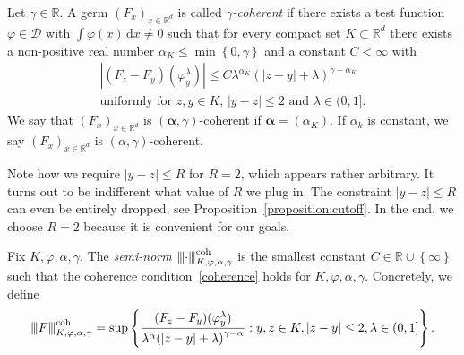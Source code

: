 \begin{definition}\label{definition:coherence}
   Let \(\gamma \in \mathbb{R}\). A germ \({(F_x)}_{x \in \mathbb{R}^d}\) is called \emph{\(\gamma\)-coherent} if there exists a test function \(\varphi \in \mathcal{D}\) with \(\int \varphi(x) \, \mathrm{d}x \neq 0\) such that for every compact set \(K \subset \mathbb{R}^d\) there exists a non-positive real number \(\alpha_K \leq \min\left\{ 0, \gamma \right\}\) and a constant \(C < \infty\) with
   \begin{gather}\label{coherence}
        |(F_z - F_y)(\varphi^\lambda_y)| \leq C\lambda^{\alpha_K}{(|z-y| + \lambda)}^{\gamma - \alpha_K}  \\ \text{uniformly for \(z,y \in K\), \(|y-z| \leq 2\)  and \(\lambda \in (0,1]\)} \nonumber. %
   \end{gather}
   We say that  \({(F_x)}_{x \in \mathbb{R}^d}\) is \((\bm{\alpha}, \gamma)\)-coherent if \(\bm \alpha = (\alpha_K)\). If \( \alpha_k \) is constant, we say \({(F_x)}_{x \in \mathbb{R}^d}\) is \(({\alpha}, \gamma)\)-coherent.
\end{definition}
\begin{remark}\label{remark:cutoff}
    Note how we require \(|y-z| \leq R\) for \( R = 2 \), which appears rather arbitrary. It turns out to be indifferent what value of \( R \) we plug in. The constraint \(|y-z| \leq R\) can even be entirely dropped, see Proposition~\ref{proposition:cutoff}. In the end, we choose \(R = 2\) because it is convenient for our goals.
\end{remark}

Fix \(K, \varphi, \alpha, \gamma\). The \emph{semi-norm \({\left\vert\kern-0.25ex\left\vert\kern-0.25ex\left\vert\cdot \right\vert\kern-0.25ex\right\vert\kern-0.25ex\right\vert}^{\mathrm{coh}}_{K,\varphi,\alpha,\gamma}\)} is the smallest constant \(C \in \mathbb{R} \cup \left\{ \infty \right\}\) such that the coherence condition~\eqref{coherence} holds for \(K, \varphi, \alpha, \gamma\). Concretely, we define
\begin{align*}
    \vertiii{F}^{\mathrm{coh}}_{K,\varphi,\alpha,\gamma} = \sup \left\{ \frac{(F_z - F_y)(\varphi^\lambda_y)}{\lambda^\alpha{(|z-y| + \lambda)}^{\gamma - \alpha}} : y,z \in K, |z-y| \leq 2, \lambda \in (0,1] \right\}. %
\end{align*}


